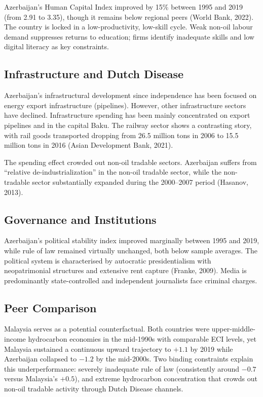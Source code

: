 \documentclass[12pt,a4paper]{report}
\begin{document}
Azerbaijan's Human Capital Index improved by 15\% between 1995 and 2019 (from 2.91 to 3.35), though it remains below regional peers (World Bank, 2022). The country is locked in a low-productivity, low-skill cycle. Weak non-oil labour demand suppresses returns to education; firms identify inadequate skills and low digital literacy as key constraints.

\subsection{Infrastructure and Dutch Disease}

Azerbaijan's infrastructural development since independence has been focused on energy export infrastructure (pipelines). However, other infrastructure sectors have declined. Infrastructure spending has been mainly concentrated on export pipelines and in the capital Baku. The railway sector shows a contrasting story, with rail goods transported dropping from 26.5 million tons in 2006 to 15.5 million tons in 2016 (Asian Development Bank, 2021).

The spending effect crowded out non-oil tradable sectors. Azerbaijan suffers from ``relative de-industrialization'' in the non-oil tradable sector, while the non-tradable sector substantially expanded during the 2000--2007 period (Hasanov, 2013).

\subsection{Governance and Institutions}

Azerbaijan's political stability index improved marginally between 1995 and 2019, while rule of law remained virtually unchanged, both below sample averages. The political system is characterised by autocratic presidentialism with neopatrimonial structures and extensive rent capture (Franke, 2009). Media is predominantly state-controlled and independent journalists face criminal charges.

\subsection{Peer Comparison}

Malaysia serves as a potential counterfactual. Both countries were upper-middle-income hydrocarbon economies in the mid-1990s with comparable ECI levels, yet Malaysia sustained a continuous upward trajectory to $+1.1$ by 2019 while Azerbaijan collapsed to $-1.2$ by the mid-2000s. Two binding constraints explain this underperformance: severely inadequate rule of law (consistently around $-0.7$ versus Malaysia's $+0.5$), and extreme hydrocarbon concentration that crowds out non-oil tradable activity through Dutch Disease channels.
\end{document}
